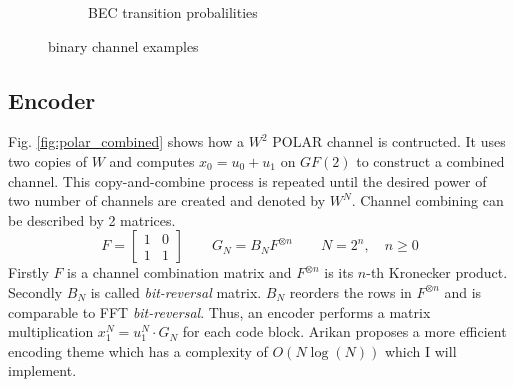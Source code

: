 \documentclass[a4paper,12pt]{scrartcl}
\begin{document}
\begin{figure}[!htb]
\begin{subfigure}{.3\textwidth}
  \caption{BEC transition probalilities}
  \label{fig:bec}
 \end{subfigure}%

\caption{binary channel examples}
\label{fig:channel_examples}
\end{figure}

\subsection{Encoder}
Fig. \ref{fig:polar_combined} shows how a $W^2$ POLAR channel is contructed.
It uses two copies of $W$ and computes $x_0 = u_0 + u_1$ on $GF(2)$ to construct a combined channel.
This copy-and-combine process is repeated until the desired power of two number of channels are created and denoted by $W^N$.
Channel combining can be described by 2 matrices.
\begin{equation}
  F = \begin{bmatrix}
 1 & 0 \\
 1 & 1
 \end{bmatrix}\quad\quad
 G_N = B_N F^{\otimes n}\quad\quad
 N = 2^n, \quad n \geq 0
\end{equation}
Firstly $F$ is a channel combination matrix and $F^{\otimes n}$ is its $n$-th Kronecker product.
Secondly $B_N$ is called \textit{bit-reversal} matrix.
$B_N$ reorders the rows in $F^{\otimes n}$ and is comparable to FFT \textit{bit-reversal}.
Thus, an encoder performs a matrix multiplication $x_1^N = u_1^N \cdot G_N $ for each code block.
Arikan proposes a more efficient encoding theme which has a complexity of $O(N \log(N))$ \cite{polar:arikan09} which I will implement.
\end{document}
